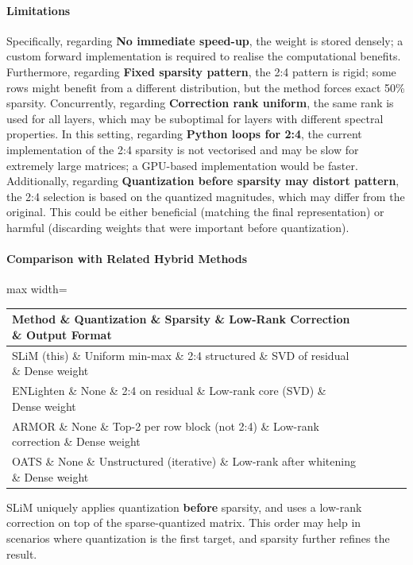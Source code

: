 \paragraph{Limitations}

Specifically, regarding \textbf{No immediate speed-up}, the weight is stored densely; a custom forward implementation is required to realise the computational benefits. Furthermore, regarding \textbf{Fixed sparsity pattern}, the 2:4 pattern is rigid; some rows might benefit from a different distribution, but the method forces exact 50\% sparsity. Concurrently, regarding \textbf{Correction rank uniform}, the same rank is used for all layers, which may be suboptimal for layers with different spectral properties. In this setting, regarding \textbf{Python loops for 2:4}, the current implementation of the 2:4 sparsity is not vectorised and may be slow for extremely large matrices; a GPU-based implementation would be faster. Additionally, regarding \textbf{Quantization before sparsity may distort pattern}, the 2:4 selection is based on the quantized magnitudes, which may differ from the original. This could be either beneficial (matching the final representation) or harmful (discarding weights that were important before quantization).


\paragraph{Comparison with Related Hybrid Methods}

\begin{center}
\begin{adjustbox}{max width=\columnwidth}
\renewcommand{\arraystretch}{1.2}
\begin{tabular}{lllll}
\toprule
Method \& Quantization \& Sparsity \& Low-Rank Correction \& Output Format \\
\midrule
SLiM (this) \& Uniform min-max \& 2:4 structured \& SVD of residual \& Dense weight \\
ENLighten \& None \& 2:4 on residual \& Low-rank core (SVD) \& Dense weight \\
ARMOR \& None \& Top-2 per row block (not 2:4) \& Low-rank correction \& Dense weight \\
OATS \& None \& Unstructured (iterative) \& Low-rank after whitening \& Dense weight \\

\bottomrule
\end{tabular}
\end{adjustbox}
\end{center}
SLiM uniquely applies quantization \textbf{before} sparsity, and uses a low-rank correction on top of the sparse-quantized matrix. This order may help in scenarios where quantization is the first target, and sparsity further refines the result.


